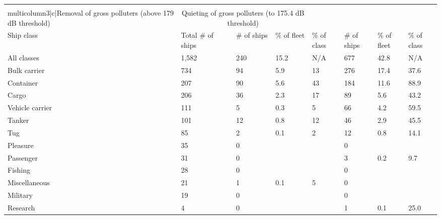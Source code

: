 \usepackage{multirow}
\begin{longtable}[]{@{}llllllll@{}}
\toprule
& & \\multicolumn{3}{|c|}{Removal of gross polluters (above 179 dB threshold)} & 
\multicolumn{3}{|c|}{Quieting of gross polluters (to 175.4 dB threshold)}\tabularnewline
\midrule
\endhead
Ship class & Total \# of ships & \# of ships & \% of fleet & \% of class
& \# of ships & \% of fleet & \% of class\tabularnewline
All classes & 1,582 & 240 & 15.2 & N/A & 677 & 42.8 & N/A\tabularnewline
Bulk carrier & 734 & 94 & 5.9 & 13 & 276 & 17.4 & 37.6\tabularnewline
Container & 207 & 90 & 5.6 & 43 & 184 & 11.6 & 88.9\tabularnewline
Cargo & 206 & 36 & 2.3 & 17 & 89 & 5.6 & 43.2\tabularnewline
Vehicle carrier & 111 & 5 & 0.3 & 5 & 66 & 4.2 & 59.5\tabularnewline
Tanker & 101 & 12 & 0.8 & 12 & 46 & 2.9 & 45.5\tabularnewline
Tug & 85 & 2 & 0.1 & 2 & 12 & 0.8 & 14.1\tabularnewline
Pleasure & 35 & 0 & & & 0 & &\tabularnewline
Passenger & 31 & 0 & & & 3 & 0.2 & 9.7\tabularnewline
Fishing & 28 & 0 & & & 0 & &\tabularnewline
Miscellaneous & 21 & 1 & 0.1 & 5 & 0 & &\tabularnewline
Military & 19 & 0 & & & 0 & &\tabularnewline
Research & 4 & 0 & & & 1 & 0.1 & 25.0\tabularnewline
\bottomrule
\end{longtable}